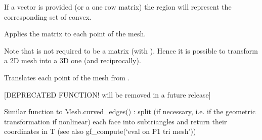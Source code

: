\documentclass[a4paper,11pt,english]{sphinxmanual}
\begin{document}
\begin{fulllineitems}
\begin{fulllineitems}
If a vector is provided (or a one row matrix) the region will represent
the corresponding set of convex.

\end{fulllineitems}


\begin{fulllineitems}
\label{\detokenize{python/cmdref_Mesh:getfem.Mesh.transform}}
Applies the matrix  to each point of the mesh.

Note that  is not required to be a  matrix (with
). Hence it is possible to transform
a 2D mesh into a 3D one (and reciprocally).

\end{fulllineitems}


\begin{fulllineitems}
\label{\detokenize{python/cmdref_Mesh:getfem.Mesh.translate}}
Translates each point of the mesh from .

\end{fulllineitems}


\begin{fulllineitems}
\label{\detokenize{python/cmdref_Mesh:getfem.Mesh.triangulated_surface}}
{[}DEPRECATED FUNCTION! will be removed in a future release{]}

Similar function to Mesh.curved\_edges() : split (if
necessary, i.e. if the geometric transformation if non\sphinxhyphen{}linear)
each face into sub\sphinxhyphen{}triangles and return their coordinates in T
(see also gf\_compute(‘eval on P1 tri mesh’))

\end{fulllineitems}


\end{fulllineitems}
\end{document}
